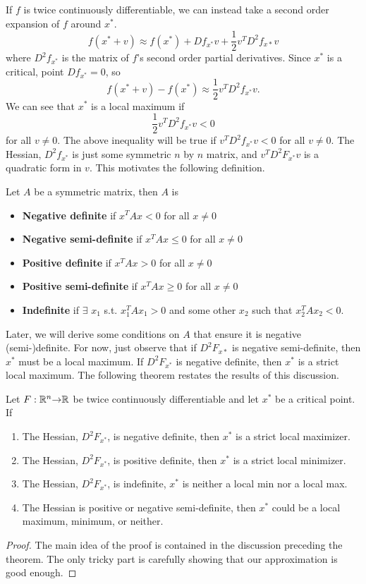 If $f$ is twice continuously differentiable, we can instead take a
second order expansion of $f$ around $x^*$.
\[ f(x^*+v) \approx f(x^*) + Df_{x^*} v + \frac{1}{2} v^T D^2 f_{x*}
v \] where $D^2 f_{x^*}$ is the matrix of $f$'s second order partial
derivatives.  Since $x^*$ is a critical, point $Df_{x^*} = 0$, so
\[ f(x^*+v) - f(x^*) \approx \frac{1}{2} v^T D^2 f_{x^*} v. \]
We can see that $x^*$ is a local maximum if 
\[ \frac{1}{2} v^T D^2 f_{x^*} v < 0 \] for all $v \neq 0$. The above
inequality will be true if $v^T D^2 f_{x^*} v < 0$ for all $v \neq 0$. The
Hessian, $D^2 f_{x^*}$ is just some symmetric $n$ by $n$ matrix, and
$v^T D^2 F_{x^*} v$ is a quadratic form in $v$. This motivates the
following definition.
\begin{definition}
  Let $A$ be a symmetric matrix, then $A$ is
  \begin{itemize}
  \item \textbf{Negative definite} if $x^T A x < 0$ for all $x \neq 0$
  \item \textbf{Negative semi-definite} if $x^T A x \leq 0$ for all $x \neq 0$
  \item \textbf{Positive definite} if $x^T A x > 0$ for all $x \neq 0$
  \item \textbf{Positive semi-definite} if $x^T A x \geq 0$ for all $x
    \neq 0$
  \item \textbf{Indefinite} if $\exists$ $x_1$ s.t. $x_1^T A x_1 > 0$ and
    some other $x_2$ such that $x_2^T A x_2 < 0$.
  \end{itemize}  
\end{definition}
Later, we will derive some conditions on $A$ that ensure it is
negative (semi-)definite. For now, just observe that if $D^2 F_{x*}$
is negative semi-definite, then $x^*$ must be a local maximum. If
$D^2F_{x^*}$ is negative definite, then $x^*$ is a strict local
maximum. The following theorem restates the results of this
discussion.
\begin{theorem}\label{thm:soc}
  Let $F: \mathbb{R}^n {\rightarrow} \mathbb{R}$ be twice continuously differentiable and
  let $x^*$ be a critical point. If
  \begin{enumerate}
  \item\label{c:smax} The Hessian, $D^2 F_{x^*}$, is negative definite,
    then $x^*$ is a strict local maximizer.  
  \item The Hessian, $D^2 F_{x^*}$, is positive definite, then $x^*$ is
    a strict local minimizer. 
  \item The Hessian, $D^2 F_{x^*}$, is indefinite, $x^*$ is neither a
    local min nor a local max.
  \item\label{c:ambig} The Hessian is positive or negative
    semi-definite, then $x^*$ could be a local maximum, minimum, or
    neither. 
  \end{enumerate}
\end{theorem}
\begin{proof}
  The main idea of the proof is contained in the discussion preceding
  the theorem. The only tricky part is carefully showing
  that our approximation is good enough. 
\end{proof}

